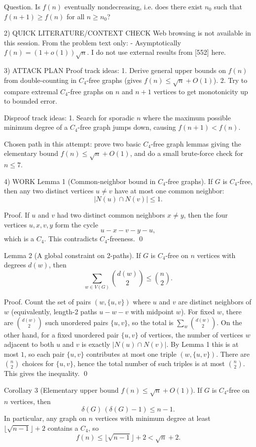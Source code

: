 Question.
Is $f(n)$ eventually nondecreasing, i.e. does there exist $n_0$ such that $f(n+1)\ge f(n)$ for all $n\ge n_0$?

2) QUICK LITERATURE/CONTEXT CHECK
Web browsing is not available in this session.
From the problem text only:
- Asymptotically $f(n)=(1+o(1))\sqrt n$.
I do not use external results from [552] here.

3) ATTACK PLAN
Proof track ideas:
1. Derive general upper bounds on $f(n)$ from double-counting in $C_4$-free graphs (gives $f(n)\le \sqrt n + O(1)$).
2. Try to compare extremal $C_4$-free graphs on $n$ and $n+1$ vertices to get monotonicity up to bounded error.

Disproof track ideas:
1. Search for sporadic $n$ where the maximum possible minimum degree of a $C_4$-free graph jumps down, causing $f(n+1)<f(n)$.

Chosen path in this attempt: prove two basic $C_4$-free graph lemmas giving the elementary bound $f(n)\le \sqrt n+O(1)$, and do a small brute-force check for $n\le 7$.

4) WORK
Lemma 1 (Common-neighbor bound in $C_4$-free graphs).
If $G$ is $C_4$-free, then any two distinct vertices $u\ne v$ have at most one common neighbor:
\[|N(u)\cap N(v)|\le 1.\]

Proof.
If $u$ and $v$ had two distinct common neighbors $x\ne y$, then the four vertices $u,x,v,y$ form the cycle
\[u-x-v-y-u,\]
which is a $C_4$. This contradicts $C_4$-freeness. \qed

Lemma 2 (A global constraint on 2-paths).
If $G$ is $C_4$-free on $n$ vertices with degrees $d(w)$, then
\[\sum_{w\in V(G)} \binom{d(w)}{2} \le \binom{n}{2}.\]

Proof.
Count the set of pairs $(w,\{u,v\})$ where $u$ and $v$ are distinct neighbors of $w$ (equivalently, length-2 paths $u-w-v$ with midpoint $w$).
For fixed $w$, there are $\binom{d(w)}{2}$ such unordered pairs $\{u,v\}$, so the total is $\sum_w \binom{d(w)}{2}$.
On the other hand, for a fixed unordered pair $\{u,v\}$ of vertices, the number of vertices $w$ adjacent to both $u$ and $v$ is exactly $|N(u)\cap N(v)|$.
By Lemma 1 this is at most $1$, so each pair $\{u,v\}$ contributes at most one triple $(w,\{u,v\})$.
There are $\binom{n}{2}$ choices for $\{u,v\}$, hence the total number of such triples is at most $\binom{n}{2}$.
This gives the inequality. \qed

Corollary 3 (Elementary upper bound $f(n)\le \sqrt n+O(1)$).
If $G$ is $C_4$-free on $n$ vertices, then
\[\delta(G)\,(\delta(G)-1)\le n-1.\]
In particular, any graph on $n$ vertices with minimum degree at least $\lfloor \sqrt{n-1}\rfloor+2$ contains a $C_4$, so
\[f(n)\le \lfloor \sqrt{n-1}\rfloor+2 < \sqrt n + 2.\]

